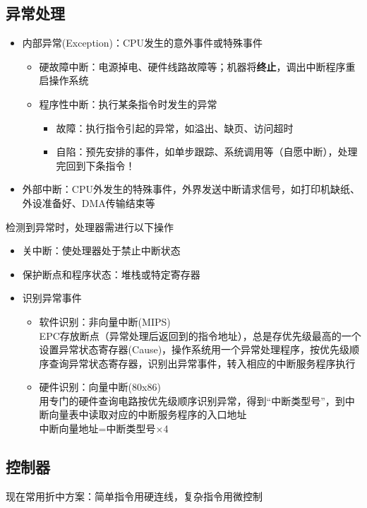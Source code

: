 \subsection{异常处理}
\begin{itemize}
	\item 内部异常(Exception)：CPU发生的意外事件或特殊事件
	\begin{itemize}
		\item 硬故障中断：电源掉电、硬件线路故障等；机器将\textbf{终止}，调出中断程序重启操作系统
		\item 程序性中断：执行某条指令时发生的异常
		\begin{itemize}
			\item 故障：执行指令引起的异常，如溢出、缺页、访问超时
			\item 自陷：预先安排的事件，如单步跟踪、系统调用等（自愿中断），处理完回到下条指令！
		\end{itemize}
	\end{itemize}
	\item 外部中断：CPU外发生的特殊事件，外界发送中断请求信号，如打印机缺纸、外设准备好、DMA传输结束等
\end{itemize}
检测到异常时，处理器需进行以下操作
\begin{itemize}
	\item 关中断：使处理器处于禁止中断状态
	\item 保护断点和程序状态：堆栈或特定寄存器
	\item 识别异常事件
	\begin{itemize}
		\item 软件识别：非向量中断(MIPS)\\
		EPC存放断点（异常处理后返回到的指令地址），总是存优先级最高的一个\\
		设置异常状态寄存器(Cause)，操作系统用一个异常处理程序，按优先级顺序查询异常状态寄存器，识别出异常事件，转入相应的中断服务程序执行
		\item 硬件识别：向量中断(80x86)\\
		用专门的硬件查询电路按优先级顺序识别异常，得到“中断类型号”，到中断向量表中读取对应的中断服务程序的入口地址\\
		中断向量地址=中断类型号$\times$4
	\end{itemize}
\end{itemize}

\subsection{控制器}
现在常用折中方案：简单指令用硬连线，复杂指令用微控制
